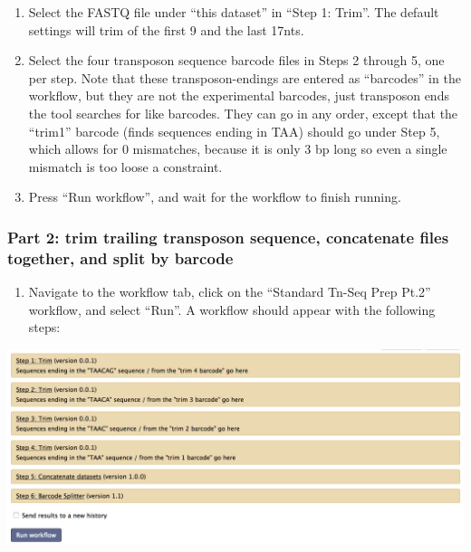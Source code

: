 \documentclass[11pt,]{article}
\providecommand{\tightlist}{%
  \setlength{\itemsep}{0pt}\setlength{\parskip}{0pt}}
\begin{document}
\begin{enumerate}
\def\labelenumi{\arabic{enumi}.}
\setcounter{enumi}{1}
\tightlist
\item
  Select the FASTQ file under ``this dataset'' in ``Step 1: Trim''. The
  default settings will trim of the first 9 and the last 17nts.
\item
  Select the four transposon sequence barcode files in Steps 2 through
  5, one per step. Note that these transposon-endings are entered as
  ``barcodes'' in the workflow, but they are not the experimental
  barcodes, just transposon ends the tool searches for like barcodes.
  They can go in any order, except that the ``trim1'' barcode (finds
  sequences ending in TAA) should go under Step 5, which allows for 0
  mismatches, because it is only 3 bp long so even a single mismatch is
  too loose a constraint.
\item
  Press ``Run workflow'', and wait for the workflow to finish running.
\end{enumerate}

\subsubsection{Part 2: trim trailing transposon sequence, concatenate
files together, and split by
barcode}\label{part-2-trim-trailing-transposon-sequence-concatenate-files-together-and-split-by-barcode}

\begin{enumerate}
\def\labelenumi{\arabic{enumi}.}
\tightlist
\item
  Navigate to the workflow tab, click on the ``Standard Tn-Seq Prep
  Pt.2'' workflow, and select ``Run''. A workflow should appear with the
  following steps:
\end{enumerate}

\centerline{\includegraphics[width=0.8\linewidth]{figs/StandPrep2.png}}
\end{document}
